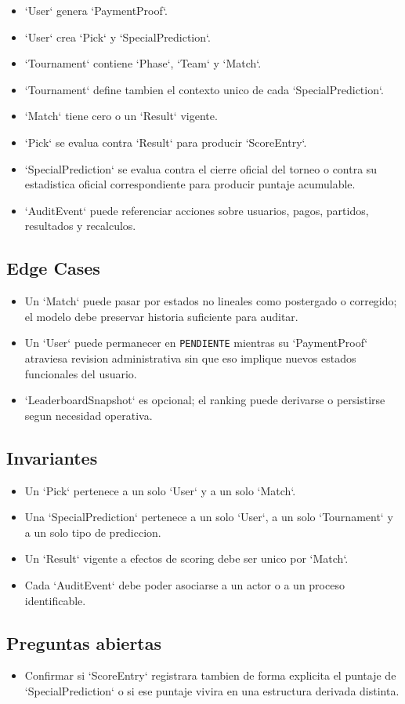 \begin{itemize}
  \item `User` genera `PaymentProof`.
  \item `User` crea `Pick` y `SpecialPrediction`.
  \item `Tournament` contiene `Phase`, `Team` y `Match`.
  \item `Tournament` define tambien el contexto unico de cada `SpecialPrediction`.
  \item `Match` tiene cero o un `Result` vigente.
  \item `Pick` se evalua contra `Result` para producir `ScoreEntry`.
  \item `SpecialPrediction` se evalua contra el cierre oficial del torneo o contra su estadistica oficial correspondiente para producir puntaje acumulable.
  \item `AuditEvent` puede referenciar acciones sobre usuarios, pagos, partidos, resultados y recalculos.
\end{itemize}

\subsection{Edge Cases}

\begin{itemize}
  \item Un `Match` puede pasar por estados no lineales como postergado o corregido; el modelo debe preservar historia suficiente para auditar.
  \item Un `User` puede permanecer en \texttt{PENDIENTE} mientras su `PaymentProof` atraviesa revision administrativa sin que eso implique nuevos estados funcionales del usuario.
  \item `LeaderboardSnapshot` es opcional; el ranking puede derivarse o persistirse segun necesidad operativa.
\end{itemize}

\subsection{Invariantes}

\begin{itemize}
  \item Un `Pick` pertenece a un solo `User` y a un solo `Match`.
  \item Una `SpecialPrediction` pertenece a un solo `User`, a un solo `Tournament` y a un solo tipo de prediccion.
  \item Un `Result` vigente a efectos de scoring debe ser unico por `Match`.
  \item Cada `AuditEvent` debe poder asociarse a un actor o a un proceso identificable.
\end{itemize}

\subsection{Preguntas abiertas}

\begin{itemize}
  \item Confirmar si `ScoreEntry` registrara tambien de forma explicita el puntaje de `SpecialPrediction` o si ese puntaje vivira en una estructura derivada distinta.
\end{itemize}
